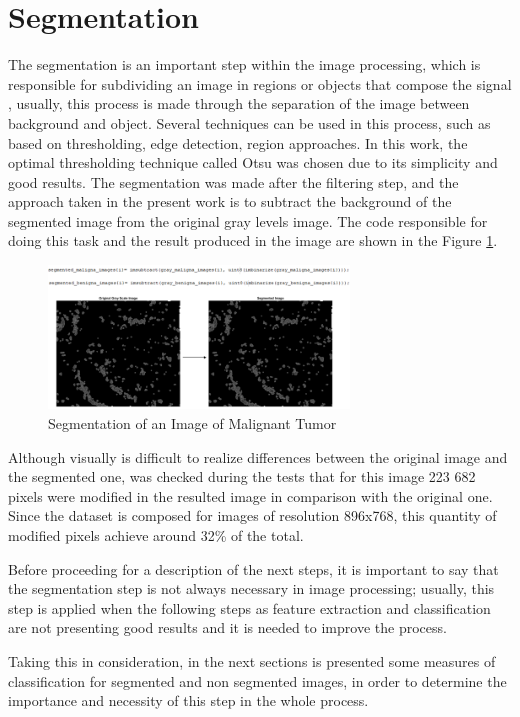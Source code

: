 \documentclass[conference]{IEEEtran}
\begin{document}
	\section{Segmentation}
		\par The segmentation is an important step within the image processing, which is responsible for subdividing  an image in regions or objects that compose the signal \cite{Gonzalez:2006:DIP:1076432}, usually, this process is made through the separation of the image between background and object. Several techniques can be used in this process, such as based on thresholding, edge detection, region approaches. In this work, the optimal thresholding technique called Otsu was chosen due to its simplicity and good results. The segmentation was made after the filtering step, and the approach taken in the present work is to subtract the background of the segmented image from the original gray levels image. The code responsible for doing this task and the result produced in the image are shown in the Figure \ref{fig:imagem_segmentacao}.
		
		\begin{figure}[h]
		    \centering
		    \includegraphics[width=8cm]{images/imagem_segmentacao.png}
		    \caption{Segmentation of an Image of Malignant Tumor}
		    \label{fig:imagem_segmentacao}
		\end{figure}
		
		\par Although visually is difficult to realize differences between the original image and the segmented one, was checked during the tests that for this image 223 682 pixels were modified in the resulted image in comparison with the original one. Since the dataset is composed for images of resolution 896x768, this quantity of modified pixels achieve around 32\% of the total.
		
		\par Before proceeding for a description of the next steps, it is important to say that the segmentation step is not always necessary in image processing; usually, this step is applied when the following steps as feature extraction and classification are not presenting good results and it is needed to improve the process.\par
		Taking this in consideration, in the next sections is presented some measures of classification for segmented and non segmented images, in order to determine the importance and necessity of this step in the whole process.
\end{document}
